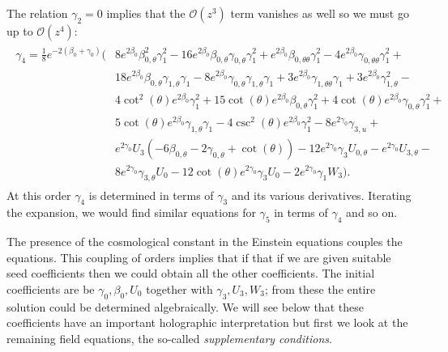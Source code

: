 \documentclass[a4paper,11pt]{article}
\numberwithin{equation}{section}
\begin{document}
The relation $\gamma_2=0$ implies that the $\mathcal{O}(z^3)$ term vanishes as well so we must go up to $\mathcal{O}(z^4)$:
\begin{align}
\begin{split}  \label{eq: gamma_4}
\gamma_4=
\frac{1}{8} e^{-2 (\beta _{0}+\gamma _{0})} (&8 e^{2 \beta _{0}} \beta _{0, \theta}^2 \gamma _{1}^2-16 e^{2 \beta _{0}} \beta _{0, \theta} \gamma _{0, \theta} \gamma _{1}^2+e^{2 \beta _{0}} \beta _{0, \theta \theta} \gamma _{1}^2-4 e^{2 \beta _{0}} \gamma _{0, \theta \theta} \gamma _{1}^2+\\
&18 e^{2 \beta _{0}} \beta _{0, \theta} \gamma _{1,\theta} \gamma _{1}-8 e^{2 \beta _{0}} \gamma _{0, \theta} \gamma _{1,\theta} \gamma _{1}+3 e^{2 \beta _{0}} \gamma _{1,\theta \theta} \gamma _{1}+3 e^{2 \beta _{0}} \gamma _{1,\theta}^2-\\
&4 \cot ^2(\theta ) e^{2 \beta _{0}} \gamma _{1}^2+15 \cot (\theta ) e^{2 \beta _{0}} \beta _{0, \theta} \gamma _{1}^2+4 \cot (\theta ) e^{2 \beta _{0}} \gamma _{0, \theta} \gamma _{1}^2+\\
&5 \cot (\theta ) e^{2 \beta _{0}} \gamma _{1,\theta} \gamma _{1}-4 \csc ^2(\theta ) e^{2 \beta _{0}} \gamma _{1}^2-8 e^{2 \gamma _{0}} \gamma _{3,u}+\\
&e^{2 \gamma _{0}} U_{3} (-6 \beta _{0, \theta}-2 \gamma _{0, \theta}+\cot (\theta ))-12 e^{2 \gamma _{0}} \gamma _{3} U_{0, \theta}-e^{2 \gamma _{0}} U_{3,\theta}-\\
&8 e^{2 \gamma _{0}} \gamma _{3,\theta} U_{0}-12 \cot (\theta ) e^{2 \gamma _{0}} \gamma _{3} U_{0}-2 e^{2 \gamma _{0}} \gamma _{1} W_{3}).
\end{split}
\end{align}
At this order $\gamma_4$ is determined in terms of $\gamma_3$ and its various derivatives. Iterating the expansion, we would find similar equations for $\gamma_5$ in terms of $\gamma_4$ and so on. 

The presence of the cosmological constant in the Einstein equations couples the equations. This coupling of orders implies that if that if we are given suitable seed coefficients then we could obtain all the other coefficients. The initial coefficients are be $\gamma_0, \beta_0, U_0$ together with $\gamma_3, U_3, W_3$; from these the entire solution could be determined algebraically. We will  see below that these coefficients have an important holographic interpretation but first we look at the remaining field equations, the so-called {\it supplementary conditions}.
\end{document}
